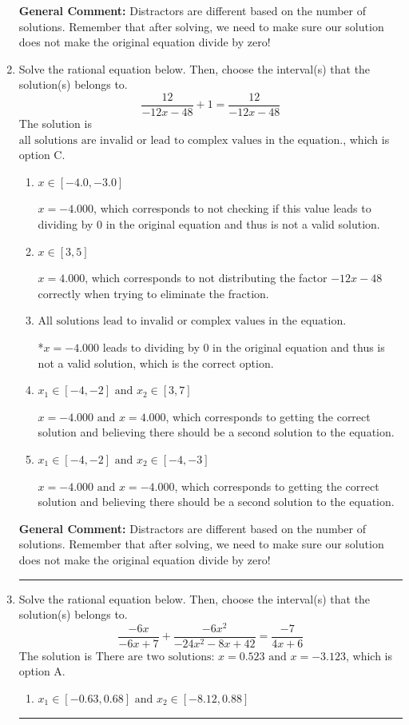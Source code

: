 \documentclass{extbook}[14pt]
\newcommand{\litem}[1]{\item #1

\rule{\textwidth}{0.4pt}}
\begin{document}
\begin{enumerate}
{\textbf{General Comment:} Distractors are different based on the number of solutions. Remember that after solving, we need to make sure our solution does not make the original equation divide by zero!
}
\litem{
Solve the rational equation below. Then, choose the interval(s) that the solution(s) belongs to.
\[ \frac{12}{-12x -48} + 1 = \frac{12}{-12x -48} \]The solution is \( \text{all solutions are invalid or lead to complex values in the equation.} \), which is option C.\begin{enumerate}[label=\Alph*.]
\item \( x \in [-4.0,-3.0] \)

$x = -4.000$, which corresponds to not checking if this value leads to dividing by 0 in the original equation and thus is not a valid solution.
\item \( x \in [3,5] \)

$x = 4.000$, which corresponds to not distributing the factor $-12x -48$ correctly when trying to eliminate the fraction.
\item \( \text{All solutions lead to invalid or complex values in the equation.} \)

*$x = -4.000$ leads to dividing by 0 in the original equation and thus is not a valid solution, which is the correct option.
\item \( x_1 \in [-4, -2] \text{ and } x_2 \in [3,7] \)

$x = -4.000 \text{ and } x = 4.000$, which corresponds to getting the correct solution and believing there should be a second solution to the equation.
\item \( x_1 \in [-4, -2] \text{ and } x_2 \in [-4,-3] \)

$x = -4.000 \text{ and } x = -4.000$, which corresponds to getting the correct solution and believing there should be a second solution to the equation.
\end{enumerate}

\textbf{General Comment:} Distractors are different based on the number of solutions. Remember that after solving, we need to make sure our solution does not make the original equation divide by zero!
}
\litem{
Solve the rational equation below. Then, choose the interval(s) that the solution(s) belongs to.
\[ \frac{-6x}{-6x + 7} + \frac{-6x^{2}}{-24x^{2} -8 x + 42} = \frac{-7}{4x + 6} \]The solution is \( \text{There are two solutions: } x = 0.523 \text{ and } x = -3.123 \), which is option A.\begin{enumerate}[label=\Alph*.]
\item \( x_1 \in [-0.63, 0.68] \text{ and } x_2 \in [-8.12,0.88] \)


\end{enumerate}}
\end{enumerate}
\end{document}
